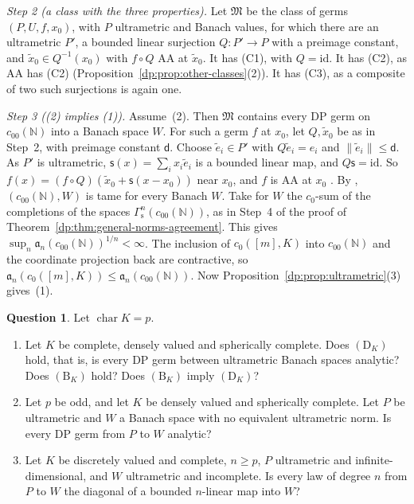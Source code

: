 \documentclass[11pt]{amsart}
\theoremstyle{definition}
\theoremstyle{remark}
\numberwithin{equation}{section}
\newcommand{\N}{\mathbb N}
\newcommand{\id}{\mathrm{id}}
\newcommand{\norm}[1]{\lVert #1\rVert}
\theoremstyle{plain}
\theoremstyle{definition}
\newtheorem{question}[theorem]{Question}
\theoremstyle{plain}
\begin{document}
\emph{Step 2 (a class with the three properties).} Let $\mathfrak M$ be the class of germs $(P,U,f,x_0)$, with $P$ ultrametric and Banach values, for which there are an ultrametric $P'$, a bounded linear surjection $Q\colon P'\to P$ with a preimage constant, and $\tilde x_0\in Q^{-1}(x_0)$ with $f\circ Q$ AA at $\tilde x_0$. It has (C1), with $Q=\id$. It has (C2), as AA has (C2) (Proposition~\ref{dp:prop:other-classes}(2)). It has (C3), as a composite of two such surjections is again one.

\emph{Step 3 ((2) implies (1)).} Assume~(2). Then $\mathfrak M$ contains every DP germ on $c_{00}(\N)$ into a Banach space $W$. For such a germ $f$ at $x_0$, let $Q,\tilde x_0$ be as in Step~2, with preimage constant $\mathsf d$. Choose $\tilde e_i\in P'$ with $Q\tilde e_i=e_i$ and $\norm{\tilde e_i}\le\mathsf d$. As $P'$ is ultrametric, $\mathsf s(x)=\sum_ix_i\tilde e_i$ is a bounded linear map, and $Q\mathsf s=\id$. So $f(x)=(f\circ Q)(\tilde x_0+\mathsf s(x-x_0))$ near $x_0$, and $f$ is AA at $x_0$ \cite[Proposition~14.12(1)(b)]{I}. By \cite[Proposition~14.37]{I}, $(c_{00}(\N),W)$ is tame for every Banach $W$. Take for $W$ the $c_0$-sum of the completions of the spaces $\Gamma^n_{\mathrm s}(c_{00}(\N))$, as in Step~4 of the proof of Theorem~\ref{dp:thm:general-norms-agreement}. This gives $\sup_n\mathfrak a_n(c_{00}(\N))^{1/n}<\infty$. The inclusion of $c_0([m],K)$ into $c_{00}(\N)$ and the coordinate projection back are contractive, so $\mathfrak a_n(c_0([m],K))\le\mathfrak a_n(c_{00}(\N))$. Now Proposition~\ref{dp:prop:ultrametric}(3) gives~(1).

\begin{question}\label{dp:q:residual}
Let $\operatorname{char}K=p$.
\begin{enumerate}
\item Let $K$ be complete, densely valued and spherically complete. Does $(\mathrm D_K)$ hold, that is, is every DP germ between ultrametric Banach spaces analytic? Does $(\mathrm B_K)$ hold? Does $(\mathrm B_K)$ imply $(\mathrm D_K)$?
\item Let $p$ be odd, and let $K$ be densely valued and spherically complete. Let $P$ be ultrametric and $W$ a Banach space with no equivalent ultrametric norm. Is every DP germ from $P$ to $W$ analytic?
\item Let $K$ be discretely valued and complete, $n\ge p$, $P$ ultrametric and infinite-dimensional, and $W$ ultrametric and incomplete. Is every law of degree $n$ from $P$ to $W$ the diagonal of a bounded $n$\nobreakdash-linear map into $W$?
\end{enumerate}
\end{question}
\end{document}
